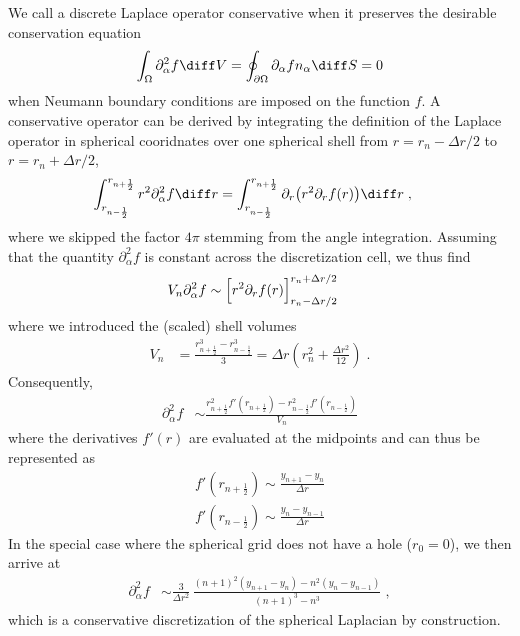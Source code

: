 \documentclass[
	superscriptaddress,
	twocolumn,
	aps, prl
]{revtex4-1}
\newcommand{\dr}{\Delta r}
\begin{document}
We call a discrete Laplace operator conservative when it preserves the desirable conservation equation
\begin{align}
	\int_\Omega \partial_\alpha^2 f \diff V
		= \oint_{\partial\Omega} \partial_\alpha f n_\alpha \diff S= 0
\end{align}
when Neumann boundary conditions are imposed on the function $f$.
A conservative operator can be derived by integrating the definition of the Laplace operator in spherical cooridnates over one spherical shell from $r=r_n - \dr/2$ to $r=r_n  + \dr/2$,
\begin{align}
	\int_{r_{n - \frac12}}^{r_{n + \frac12}} r^2 \partial_\alpha^2 f \diff r
		&= \int_{r_{n - \frac12}}^{r_{n + \frac12}} \partial_r\bigl(r^2 \partial_r f(r)\bigr) \diff r
	\;,
\end{align}
where we skipped the factor $4\pi$ stemming from the angle integration.
Assuming that the quantity $\partial_\alpha^2 f$ is constant across the discretization cell, we thus find
\begin{align}
	V_n \partial_\alpha^2 f %
		&\sim \Bigl[r^2 \partial_r f(r)\Bigr]_{r_n - \dr/2}^{r_n + \dr/2}
\end{align}
where we introduced the (scaled) shell volumes
\begin{align}
	V_n &= \frac{r_{n + \frac12}^3 - r_{n - \frac12}^3}{3}
	= \dr \left(	r_n^2 + \frac{\dr^2}{12} \right)
\;.
\end{align}
Consequently,
\begin{align}
	\partial_\alpha^2 f
		&\sim \frac{r_{n+\frac12}^2 f'\left(r_{n+\frac12}\right) - r_{n-\frac12}^2 f'\left(r_{n-\frac12}\right)}{V_n}
\end{align}
where the derivatives $f'(r)$ are evaluated at the midpoints and can thus be represented as
\begin{subequations}
\begin{align}
	f'\left(r_{n + \frac12}\right) \sim \frac{y_{n+1} - y_n}{\dr}
\\
	f'\left(r_{n - \frac12}\right) \sim \frac{y_n - y_{n-1}}{\dr}
\end{align}
\end{subequations}
In the special case where the spherical grid does not have a hole ($r_0=0$), we then arrive at
\begin{align}
	\partial_\alpha^2 f
		&\sim \frac{3}{\dr^2} \, \frac{(n + 1)^2 (y_{n+1} - y_n) - n^2 (y_n - y_{n-1})}{(n + 1)^3 - n^3}
	\;,
\end{align}
which is a conservative discretization of the spherical Laplacian by construction.
\end{document}
